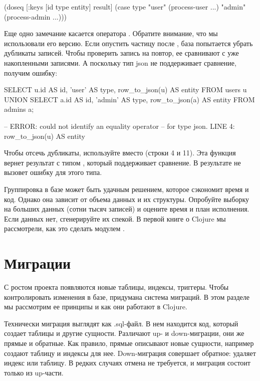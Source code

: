 \begin{english}
  \begin{clojure}
(doseq [{:keys [id type entity]} result]
  (case type
    "user" (process-user ...)
    "admin" (process-admin ...)))
  \end{clojure}
\end{english}

Еще одно замечание касается оператора . Обратите внимание, что мы использовали его  версию. Если опустить частицу  после , база попытается убрать дубликаты записей. Чтобы проверить запись на повтор, ее сравнивают с уже накопленными записями. А поскольку тип json не поддерживает сравнение, получим ошибку:

\begin{english}
  \begin{sql/lines}
SELECT
  u.id AS id,
  'user' AS type,
  row_to_json(u) AS entity
FROM
  users u
UNION
SELECT
  a.id AS id,
  'admin' AS type,
  row_to_json(a) AS entity
FROM
  admins a;

-- ERROR: could not identify an equality operator
-- for type json. LINE 4: row_to_json(u) AS entity
  \end{sql/lines}
\end{english}

Чтобы отсечь дубликаты, используйте  вместо  (строки 4 и 11). Эта функция вернет результат с типом , который поддерживает сравнение. В результате  не вызовет ошибку для этого типа.

Группировка в базе может быть удачным решением, которое сэкономит время и код. Однако она зависит от объема данных и их структуры. Опробуйте выборку на больших данных (сотни тысяч записей) и оцените время и план исполнения. Если данных нет, сгенерируйте их спекой. В первой книге о Clojure мы рассмотрели, как это сделать модулем .

\section{Миграции}

С ростом проекта появляются новые таблицы, индексы, триггеры. Чтобы контролировать изменения в базе, придумана система миграций. В этом разделе мы рассмотрим ее принципы и как они работают в Clojure.

Технически миграция выглядят как .sql-файл. В нем находится код, который создает таблицы и другие сущности. Различают up- и down-миграции, они же прямые и обратные. Как правило, прямые описывают новые сущности, например создают таблицу и индексы для нее. Down-миграция совершает обратное: удаляет индекс или таблицу. В редких случаях отмена не требуется, и миграция состоит только из up-части.

